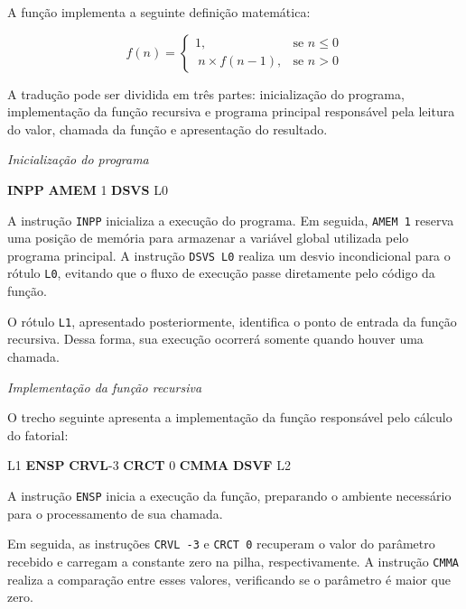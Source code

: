 \documentclass[
  brazilian,
  letterpaper,
]{book}
\newenvironment{Shaded}{\begin{snugshade}}{\end{snugshade}}
\newcommand{\DecValTok}[1]{\textcolor[rgb]{0.68,0.00,0.00}{#1}}
\newcommand{\FunctionTok}[1]{\textcolor[rgb]{0.28,0.35,0.67}{#1}}
\newcommand{\KeywordTok}[1]{\textcolor[rgb]{0.00,0.23,0.31}{\textbf{#1}}}
\newcommand{\NormalTok}[1]{\textcolor[rgb]{0.00,0.23,0.31}{#1}}
\theoremstyle{plain}
\theoremstyle{definition}
\theoremstyle{remark}
\begin{document}
A função implementa a seguinte definição matemática:

\[ f(n)= \begin{cases} 1, & \text{se } n \leq 0\\\ n \times f(n-1), & \text{se } n > 0 \end{cases} \]

A tradução pode ser dividida em três partes: inicialização do programa,
implementação da função recursiva e programa principal responsável pela
leitura do valor, chamada da função e apresentação do resultado.

\emph{Inicialização do programa}

\begin{Shaded}
\begin{Highlighting}[]
    \KeywordTok{INPP}
    \KeywordTok{AMEM}    \DecValTok{1}
    \KeywordTok{DSVS}    \FunctionTok{L0}
\end{Highlighting}
\end{Shaded}

A instrução \texttt{INPP} inicializa a execução do programa. Em seguida,
\texttt{AMEM\ 1} reserva uma posição de memória para armazenar a
variável global utilizada pelo programa principal. A instrução
\texttt{DSVS\ L0} realiza um desvio incondicional para o rótulo
\texttt{L0}, evitando que o fluxo de execução passe diretamente pelo
código da função.

O rótulo \texttt{L1}, apresentado posteriormente, identifica o ponto de
entrada da função recursiva. Dessa forma, sua execução ocorrerá somente
quando houver uma chamada.

\emph{Implementação da função recursiva}

O trecho seguinte apresenta a implementação da função responsável pelo
cálculo do fatorial:

\begin{Shaded}
\begin{Highlighting}[]
\FunctionTok{L1}  \KeywordTok{ENSP}
    \KeywordTok{CRVL}\NormalTok{    {-}}\DecValTok{3}
    \KeywordTok{CRCT}    \DecValTok{0}
    \KeywordTok{CMMA}
    \KeywordTok{DSVF}    \FunctionTok{L2}
\end{Highlighting}
\end{Shaded}

A instrução \texttt{ENSP} inicia a execução da função, preparando o
ambiente necessário para o processamento de sua chamada.

Em seguida, as instruções \texttt{CRVL\ -3} e \texttt{CRCT\ 0} recuperam
o valor do parâmetro recebido e carregam a constante zero na pilha,
respectivamente. A instrução \texttt{CMMA} realiza a comparação entre
esses valores, verificando se o parâmetro é maior que zero.
\end{document}
